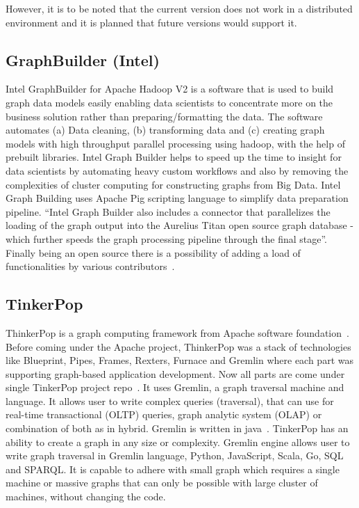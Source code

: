     However, it is to be noted that the current version does not work
    in a distributed environment and it is planned that future
    versions would support it.
    
\subsection{GraphBuilder (Intel)}

Intel GraphBuilder for Apache Hadoop V2 is a software that is used to
build graph data models easily enabling data scientists to concentrate
more on the business solution rather than preparing/formatting the
data. The software automates (a) Data cleaning, (b) transforming data and
(c) creating graph models with high throughput parallel processing using
hadoop, with the help of prebuilt libraries. Intel Graph Builder helps
to speed up the time to insight for data scientists by automating
heavy custom workflows and also by removing the complexities of
cluster computing for constructing graphs from Big Data. Intel Graph
Building uses Apache Pig scripting language to simplify data
preparation pipeline.  ``Intel Graph Builder also includes a connector
that parallelizes the loading of the graph output into the Aurelius
Titan open source graph database - which further speeds the graph
processing pipeline through the final stage''.  Finally being an open
source there is a possibility of adding a load of functionalities by
various contributors~\cite{graphbuilder}.

    
\subsection{TinkerPop}
    
ThinkerPop is a graph computing framework from Apache software
foundation~\cite{www-ApacheTinkerPop}. Before coming under the Apache
project, ThinkerPop was a stack of technologies like Blueprint, Pipes,
Frames, Rexters, Furnace and Gremlin where each part was supporting
graph-based application development. Now all parts are come under
single TinkerPop project repo~\cite{www-news}. It uses Gremlin, a
graph traversal machine and language. It allows user to write complex
queries (traversal), that can use for real-time transactional (OLTP)
queries, graph analytic system (OLAP) or combination of both as in
hybrid. Gremlin is written in
java~\cite{www-ApacheTinkerPopHome}. TinkerPop has an ability to
create a graph in any size or complexity. Gremlin engine allows user
to write graph traversal in Gremlin language, Python, JavaScript,
Scala, Go, SQL and SPARQL. It is capable to adhere with small graph
which requires a single machine or massive graphs that can only be
possible with large cluster of machines, without changing the code.

